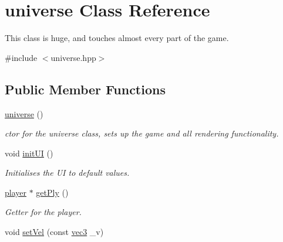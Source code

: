 \hypertarget{classuniverse}{\section{universe Class Reference}
\label{classuniverse}
}


This class is huge, and touches almost every part of the game.  




{\ttfamily \#include $<$universe.\-hpp$>$}

\subsection*{Public Member Functions}
\begin{DoxyCompactItemize}
\item 
\hypertarget{classuniverse_a53128b9e55c9bb4aff9b0a767db376ef}{\hyperlink{classuniverse_a53128b9e55c9bb4aff9b0a767db376ef}{universe} ()}\label{classuniverse_a53128b9e55c9bb4aff9b0a767db376ef}

\begin{DoxyCompactList}\small\item\em ctor for the universe class, sets up the game and all rendering functionality. \end{DoxyCompactList}\item 
\hypertarget{classuniverse_ac2990f82203890ee22f9a9de1aaec7a1}{void \hyperlink{classuniverse_ac2990f82203890ee22f9a9de1aaec7a1}{init\-U\-I} ()}\label{classuniverse_ac2990f82203890ee22f9a9de1aaec7a1}

\begin{DoxyCompactList}\small\item\em Initialises the U\-I to default values. \end{DoxyCompactList}\item 
\hypertarget{classuniverse_a2f8a7a121a0f933d32789606144d8916}{\hyperlink{classplayer}{player} $\ast$ \hyperlink{classuniverse_a2f8a7a121a0f933d32789606144d8916}{get\-Ply} ()}\label{classuniverse_a2f8a7a121a0f933d32789606144d8916}

\begin{DoxyCompactList}\small\item\em Getter for the player. \end{DoxyCompactList}\item 
\hypertarget{classuniverse_a2e9b69d19436492db80f60a15850b26e}{void \hyperlink{classuniverse_a2e9b69d19436492db80f60a15850b26e}{set\-Vel} (const \hyperlink{structvec3}{vec3} \-\_\-v)}\label{classuniverse_a2e9b69d19436492db80f60a15850b26e}


\end{DoxyCompactItemize}
